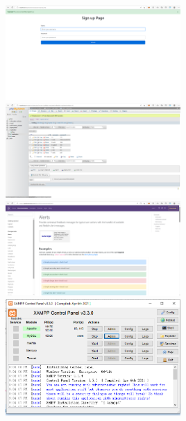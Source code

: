 \documentclass[a4paper, 11pt]{report}
\begin{document}
\includegraphics[width=0.5\textwidth]{Local}
\includegraphics[width=0.5\textwidth]{PHPadmin}
\includegraphics[width=0.5\textwidth]{getbootstrap}
\includegraphics[width=0.5\textwidth]{XAMPP}

\newpage


\end{document}
